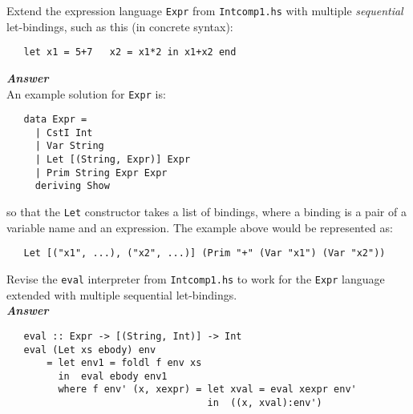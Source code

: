 \documentclass[a4paper]{article}
\begin{document}
\begin{exercise}\label{exer-multi-let-eval}
  Extend the expression language \texttt{Expr} from \texttt{Intcomp1.hs}
  with multiple \emph{sequential} let-bindings, such as this (in
  concrete syntax):

{\codesetup\begin{verbatim}
   let x1 = 5+7   x2 = x1*2 in x1+x2 end
\end{verbatim}}

\noindent
\textbf{\emph{Answer}}\\
An example solution for \texttt{Expr} is: 

{\codesetup\begin{verbatim}
   data Expr = 
     | CstI Int
     | Var String
     | Let [(String, Expr)] Expr    
     | Prim String Expr Expr
     deriving Show
\end{verbatim}}

\noindent 
so that the \texttt{Let} constructor takes a list of bindings, where a
binding is a pair of a variable name and an expression.  The example
above would be represented as:

{\codesetup\begin{verbatim}
   Let [("x1", ...), ("x2", ...)] (Prim "+" (Var "x1") (Var "x2"))
\end{verbatim}}

\vspace{0.3cm}
\noindent 
Revise the \texttt{eval} interpreter from \texttt{Intcomp1.hs} to work
for the \texttt{Expr} language extended with multiple sequential
let-bindings.  \\

\noindent
\textbf{\emph{Answer}}
{\codesetup\begin{verbatim}
   eval :: Expr -> [(String, Int)] -> Int 
   eval (Let xs ebody) env
       = let env1 = foldl f env xs
         in  eval ebody env1
         where f env' (x, xexpr) = let xval = eval xexpr env'
                                   in  ((x, xval):env')
\end{verbatim}}

\end{exercise}
\end{document}
